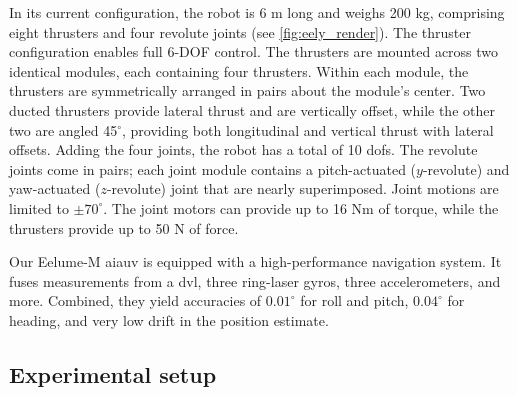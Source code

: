 \documentclass[../main.tex]{subfiles}
\begin{document}
In its current configuration, the robot is 6 m long and weighs 200 kg, comprising eight thrusters and four revolute joints (see \cref{fig:eely_render}). The thruster configuration enables full 6-DOF control. The thrusters are mounted across two identical modules, each containing four thrusters. Within each module, the thrusters are symmetrically arranged in pairs about the module's center. Two ducted thrusters provide lateral thrust and are vertically offset, while the other two are angled 45$^\circ$, providing both longitudinal and vertical thrust with lateral offsets. Adding the four joints, the robot has a total of 10 \glspl{dof}. The revolute joints come in pairs; each joint module contains a pitch-actuated ($y$-revolute) and yaw-actuated ($z$-revolute) joint that are nearly superimposed. Joint motions are limited to \( \pm 70^\circ \). The joint motors can provide up to 16 Nm of torque, while the thrusters provide up to 50 N of force.

Our Eelume-M \gls{aiauv} is equipped with a high-performance navigation system. It fuses measurements from a \gls{dvl}, three ring-laser gyros, three accelerometers, and more. Combined, they yield accuracies of \( 0.01^\circ \) for roll and pitch, \( 0.04^\circ \) for heading, and very low drift in the position estimate.

\subsection{Experimental setup}
\label{sec:experiment_setup}


\end{document}
